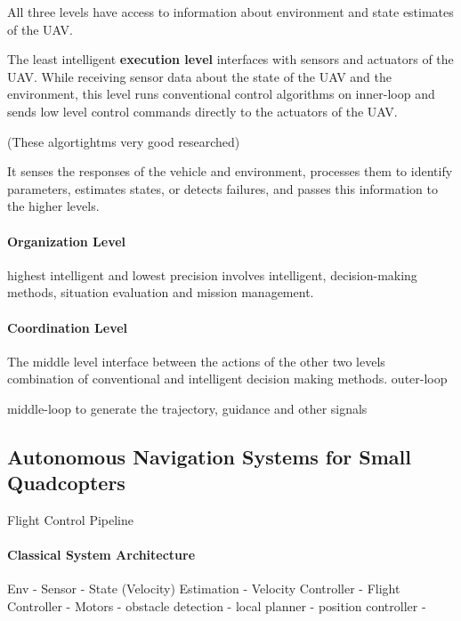 All three levels have access to
information about 
environment and state estimates of the UAV.

The least intelligent \textbf{execution level}
interfaces with sensors and actuators
of the UAV. While receiving sensor data about
the state of the UAV and the environment,
this level runs conventional  control  algorithms 
on inner-loop and sends low level control
commands directly to the actuators of the UAV.



(These algortightms very good researched)




It  senses  the  responses  of  the  vehicle  and  environment,    
processes    them    to    identify    parameters,    
estimates   states,   or   detects   failures,   
and   passes   this   information to the higher levels.


\paragraph{Organization Level}

highest   intelligent    and    lowest    precision
involves    intelligent,    decision-making  methods,  
situation  evaluation  and  mission  management. 




\paragraph{Coordination Level}

The  middle  level
interface between the actions of the other  two  levels  
combination  of  conventional  and   intelligent   decision   making   methods.   
outer-loop

middle-loop  to  generate  the  trajectory,  guidance  and  other  signals






\subsection{Autonomous Navigation Systems for Small Quadcopters}
Flight Control Pipeline


\paragraph{Classical System Architecture}
Env - Sensor - State (Velocity) Estimation                              - Velocity Controller - Flight Controller - Motors
             - obstacle detection - local planner - position controller -


